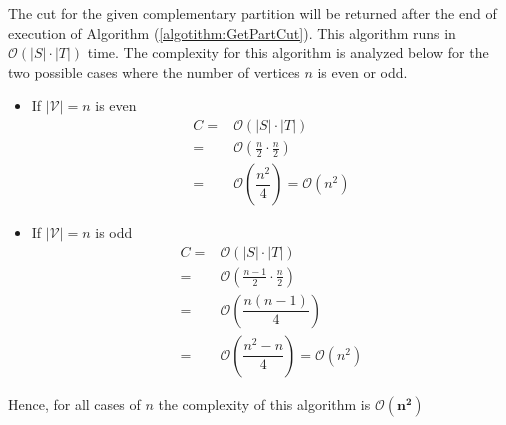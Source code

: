 \documentclass[longpaper, english, final, times]{revdetua}
\begin{document}
				The cut for the given complementary partition will be returned after the end of execution of Algorithm (\ref{algotithm:GetPartCut}). This algorithm runs in $\mathcal{O}(|S|\cdot |T|)$ time. The complexity for this algorithm is analyzed below for the two possible cases where the number of vertices $n$ is even or odd. 
				\begin{itemize}
					\label{list:getpartcut}
					\item If $|\mathcal{V}|=n$ is even
					\begin{align*}
						C = & \mathcal{O}\left(|S|\cdot|T|\right)\\
						= & \mathcal{O}\left(\frac{n}{2}\cdot \frac{n}{2}\right)\\
						= & \mathcal{O}\left(\dfrac{n^2}{4}\right) = \mathcal{O}(n^2)
					\end{align*}
					\item If $|\mathcal{V}|=n$ is odd
					\begin{align*}
						C = & \mathcal{O}\left(|S|\cdot |T|\right)\\
						= & \mathcal{O}\left(\frac{n-1}{2}\cdot \frac{n}{2}\right)\\
						= & \mathcal{O}\left(\dfrac{n(n-1)}{4}\right) \\
						= & \mathcal{O}\left(\dfrac{n^2-n}{4}\right)  = \mathcal{O}(n^2)
					\end{align*}
				\end{itemize}
				Hence, for all cases of $n$ the complexity of this algorithm is $\mathbf{\mathcal{O}(n^2)}$\\
			
\end{document}
